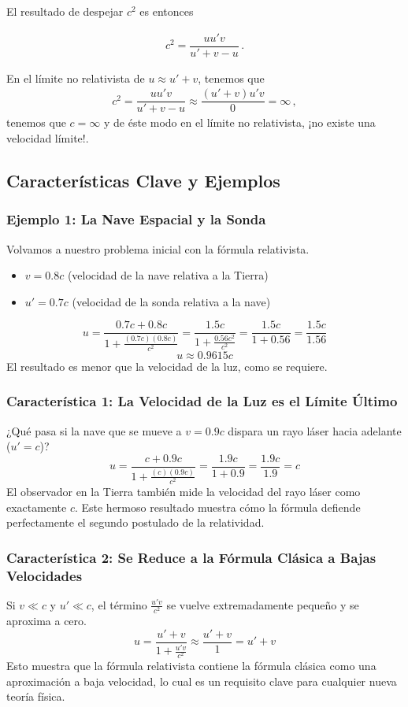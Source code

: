 \documentclass[11pt,a4paper]{article}
\begin{document}
El resultado de despejar $c^2$ es entonces

\begin{align}
\boxed{
    c^2 = \dfrac{u u'v}{ u' + v - u}
    \,.}
\end{align}

En el límite no relativista de $u\approx u'+v$, tenemos que
\begin{align}
    c^2 = \dfrac{u u'v}{ u' + v - u} \approx \dfrac{(u'+v) u'v}{0} = \infty\,, 
\end{align}
tenemos que  $c = \infty$ y de éste modo en el límite no relativista, ¡no existe una velocidad límite!.


\subsection{Características Clave y Ejemplos}

\subsubsection{Ejemplo 1: La Nave Espacial y la Sonda}
Volvamos a nuestro problema inicial con la fórmula relativista.
\begin{itemize}
    \item $v = 0.8c$ (velocidad de la nave relativa a la Tierra)
    \item $u' = 0.7c$ (velocidad de la sonda relativa a la nave)
\end{itemize}
\[ u = \frac{0.7c + 0.8c}{1 + \frac{(0.7c)(0.8c)}{c^2}} = \frac{1.5c}{1 + \frac{0.56c^2}{c^2}} = \frac{1.5c}{1 + 0.56} = \frac{1.5c}{1.56} \]
\[ u \approx 0.9615c \]
El resultado es menor que la velocidad de la luz, como se requiere.

\subsubsection{Característica 1: La Velocidad de la Luz es el Límite Último}
¿Qué pasa si la nave que se mueve a $v=0.9c$ dispara un rayo láser hacia adelante ($u'=c$)?
\[ u = \frac{c + 0.9c}{1 + \frac{(c)(0.9c)}{c^2}} = \frac{1.9c}{1 + 0.9} = \frac{1.9c}{1.9} = c \]
El observador en la Tierra también mide la velocidad del rayo láser como exactamente $c$. Este hermoso resultado muestra cómo la fórmula defiende perfectamente el segundo postulado de la relatividad. 

\subsubsection{Característica 2: Se Reduce a la Fórmula Clásica a Bajas Velocidades}
Si $v \ll c$ y $u' \ll c$, el término $\frac{u'v}{c^2}$ se vuelve extremadamente pequeño y se aproxima a cero.
\[ u = \frac{u' + v}{1 + \frac{u'v}{c^2}} \approx \frac{u' + v}{1} = u' + v \]
Esto muestra que la fórmula relativista contiene la fórmula clásica como una aproximación a baja velocidad, lo cual es un requisito clave para cualquier nueva teoría física.
\end{document}
